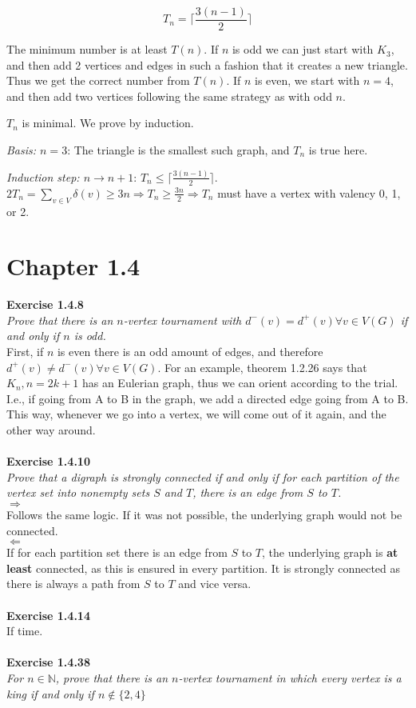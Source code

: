 \[T_{n} = \lceil \frac{3(n-1)}{2} \rceil\]

The minimum number is at least $T(n)$. If $n$ is odd we can just start with $K_{3}$, and then add 2 vertices and edges in such a fashion that it creates a new triangle. Thus we get the correct number from $T(n)$. If $n$ is even, we start with $n = 4$, and then add two vertices following the same strategy as with odd $n$.

$T_{n}$ is minimal. We prove by induction.

\textit{Basis: $n=3$}: The triangle is the smallest such graph, and $T_{n}$ is true here.

\textit{Induction step: $n \rightarrow n+1$}: $T_{n} \le \lceil \frac{3(n-1)}{2} \rceil$. $2T_{n} = \sum_{v \in V} \delta(v) \ge 3n \Rightarrow T_{n} \ge \frac{3n}{2} \Rightarrow T_{n}$ must have a vertex with valency 0, 1, or 2.


\section{Chapter 1.4}
\noindent
\textbf{Exercise 1.4.8}\\
\noindent
\textit{Prove that there is an $n$-vertex tournament with $d^{-}(v) = d^{+}(v) \forall v \in V(G)$ if and only if $n$ is odd.}\\

First, if $n$ is even there is an odd amount of edges, and therefore $d^{+}(v) \ne d^{-}(v) \forall v \in V(G)$. For an example, theorem 1.2.26 says that $K_{n}, n = 2k+1$ has an Eulerian graph, thus we can orient according to the trial. I.e., if going from A to B in the graph, we add a directed edge going from A to B. This way, whenever we go into a vertex, we will come out of it again, and the other way around.
\\\\
\noindent
\textbf{Exercise 1.4.10}\\
\noindent
\textit{Prove that a digraph is strongly connected if and only if for each partition of the vertex set into nonempty sets $S$ and $T$, there is an edge from $S$ to $T$.}\\
\noindent
$\Rightarrow$\\
Follows the same logic. If it was not possible, the underlying graph would not be connected.\\
\noindent
$\Leftarrow$\\
If for each partition set there is an edge from $S$ to $T$, the underlying graph is \textbf{at least} connected, as this is ensured in every partition.
It is strongly connected as there is always a path from $S$ to $T$ and vice versa.
\\\\
\noindent
\textbf{Exercise 1.4.14}\\
\noindent
If time.
\\\\
\noindent
\textbf{Exercise 1.4.38}\\
\noindent
\textit{For $n \in \mathbb{N}$, prove that there is an $n$-vertex tournament in which every vertex is a king if and only if $n \notin \{2, 4\}$}\\

